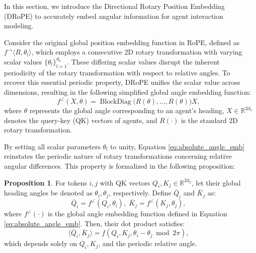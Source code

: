 \documentclass[lettersize,journal]{IEEEtran}
\theoremstyle{definition}
\newtheorem{proposition}{Proposition}
\begin{document}
In this section, we introduce the Directional Rotary Position Embedding (DRoPE) to accurately embed angular information for agent interaction modeling.

Consider the original global position embedding function in RoPE, defined as \( f^\rightarrow\langle R,\theta_l\rangle \), which employs a consecutive 2D rotary transformation with varying scalar values $\{\theta_l\}_{l=1}^{d_k}$. These differing scalar values disrupt the inherent periodicity of the rotary transformation with respect to relative angles. To recover this essential periodic property, DRoPE unifies the scalar value across dimensions, resulting in the following simplified global angle embedding function:
\begin{equation}
\label{eq:absolute_angle_emb}
f^\angle(X,\theta) = \operatorname{BlockDiag}\big(R(\theta), \dots, R(\theta)\big)X,
\end{equation}
where \(\theta\) represents the global angle corresponding to an agent’s heading, \(X \in \mathbb{R}^{2d_k}\) denotes the query-key (QK) vectors of agents, and \(R(\cdot)\) is the standard 2D rotary transformation.

By setting all scalar parameters \(\theta_l\) to unity, Equation \eqref{eq:absolute_angle_emb} reinstates the periodic nature of rotary transformations concerning relative angular differences. This property is formalized in the following proposition:

\begin{proposition}
\label{prop:DRoPE_valid}
For tokens \(i,j\) with QK vectors \(Q_i,K_j\in \mathbb{R}^{2d_k}\), let their global heading angles be denoted as \(\theta_i,\theta_j\), respectively. Define \(\bar{Q}_i\) and \(\bar{K}_j\) as:
\begin{equation}
    \bar{Q}_i = f^\angle(Q_i,\theta_i),\,\, \bar{K}_j = f^\angle(K_j,\theta_j),
\end{equation}
where \(f^\angle(\cdot)\) is the global angle embedding function defined in Equation \eqref{eq:absolute_angle_emb}. Then, their dot product satisfies:
\begin{equation}
    \langle\bar{Q}_i, \bar{K}_j\rangle = f(Q_i,K_j,\theta_i-\theta_j \bmod 2\pi),
\end{equation}
which depends solely on \(Q_i, K_j\), and the periodic relative angle.
\end{proposition}
\end{document}
